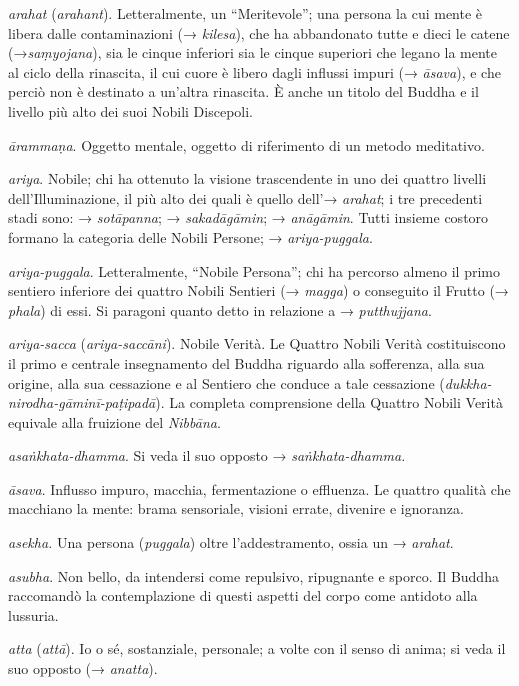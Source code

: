 \emph{arahat} (\emph{arahant}). Letteralmente, un ``Meritevole''; una
persona la cui mente è libera dalle contaminazioni (→ \emph{kilesa}),
che ha abbandonato tutte e dieci le catene (→\emph{saṃyojana}), sia le
cinque inferiori sia le cinque superiori che legano la mente al ciclo
della rinascita, il cui cuore è libero dagli influssi impuri (→
\emph{āsava}), e che perciò non è destinato a un'altra rinascita. È
anche un titolo del Buddha e il livello più alto dei suoi Nobili
Discepoli.

\emph{ārammaṇa}. Oggetto mentale, oggetto di riferimento di un metodo
meditativo.

\emph{ariya}. Nobile; chi ha ottenuto la visione trascendente in uno dei
quattro livelli dell'Illuminazione, il più alto dei quali è quello
dell'→ \emph{arahat}; i tre precedenti stadi sono: → \emph{sotāpanna}; →
\emph{sakadāgāmin}; → \emph{anāgāmin}. Tutti insieme costoro formano la
categoria delle Nobili Persone; → \emph{ariya-puggala}.

\emph{ariya-puggala}. Letteralmente, ``Nobile Persona''; chi ha percorso
almeno il primo sentiero inferiore dei quattro Nobili Sentieri (→
\emph{magga}) o conseguito il Frutto (→ \emph{phala}) di essi. Si
paragoni quanto detto in relazione a → \emph{putthujjana}.

\emph{ariya-sacca} (\emph{ariya-saccāni}). Nobile Verità. Le Quattro
Nobili Verità costituiscono il primo e centrale insegnamento del Buddha
riguardo alla sofferenza, alla sua origine, alla sua cessazione e al
Sentiero che conduce a tale cessazione
(\emph{dukkha-nirodha-gāminī-paṭipadā}). La completa comprensione della
Quattro Nobili Verità equivale alla fruizione del \emph{Nibbāna}.

\emph{asaṅkhata-dhamma}. Si veda il suo opposto →
\emph{saṅkhata-dhamma.}

\emph{āsava}. Influsso impuro, macchia, fermentazione o effluenza. Le
quattro qualità che macchiano la mente: brama sensoriale, visioni
errate, divenire e ignoranza.

\emph{asekha.} Una persona (\emph{puggala}) oltre l'addestramento, ossia
un → \emph{arahat}.

\emph{asubha}. Non bello, da intendersi come repulsivo, ripugnante e
sporco. Il Buddha raccomandò la contemplazione di questi aspetti del
corpo come antidoto alla lussuria.

\emph{atta} (\emph{attā}). Io o sé, sostanziale, personale; a volte con
il senso di anima; si veda il suo opposto (→ \emph{anatta}).

